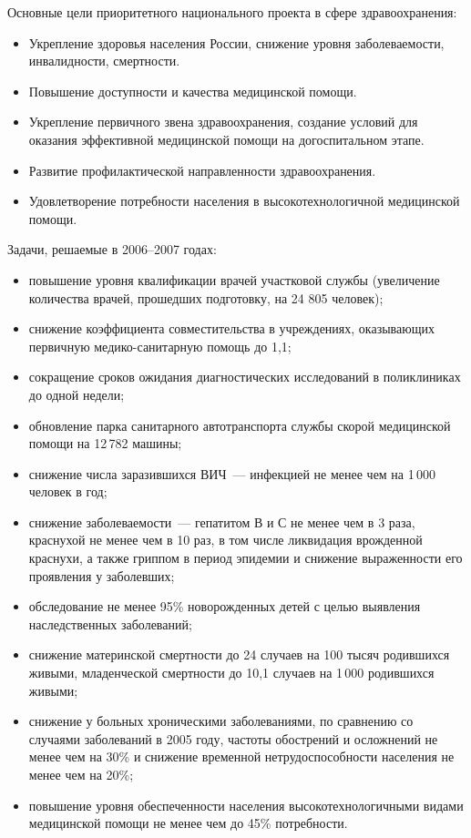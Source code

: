 \documentclass[article, 12pt, russian, oneside]{ncc}
\begin{document}
Основные цели приоритетного национального проекта в сфере здравоохранения:

\begin{itemize}
\item Укрепление здоровья населения России, снижение уровня заболеваемости, инвалидности, смертности.
\item Повышение доступности и качества медицинской помощи.
\item Укрепление первичного звена здравоохранения, создание условий для оказания эффективной медицинской помощи на догоспитальном этапе.
\item Развитие профилактической направленности здравоохранения.
\item Удовлетворение потребности населения в высокотехнологичной медицинской помощи.
\end{itemize}

Задачи, решаемые в 2006--2007 годах:

\begin{itemize}
\item повышение уровня квалификации врачей участковой службы (увеличение количества врачей, прошедших подготовку, на 24 805 человек);
\item снижение коэффициента совместительства в учреждениях, оказывающих первичную медико-санитарную помощь до 1,1;
\item сокращение сроков ожидания диагностических исследований в поликлиниках до одной недели;
\item обновление парка санитарного автотранспорта службы скорой медицинской помощи на 12\,782 машины;
\item снижение числа заразившихся ВИЧ~--- инфекцией не менее чем на 1\,000 человек в год;
\item снижение заболеваемости~--- гепатитом В и С не менее чем в 3 раза, краснухой не менее чем в 10 раз, в том числе ликвидация врожденной краснухи, а также гриппом в период эпидемии и снижение выраженности его проявления у заболевших;
\item обследование не менее 95\% новорожденных детей с целью выявления наследственных заболеваний;
\item снижение материнской смертности до 24 случаев на 100 тысяч родившихся живыми, младенческой смертности до 10,1 случаев на 1\,000 родившихся живыми;
\item снижение у больных хроническими заболеваниями, по сравнению со случаями заболеваний в 2005 году, частоты обострений и осложнений не менее чем на 30\% и снижение временной нетрудоспособности населения не менее чем на 20\%;
\item повышение уровня обеспеченности населения высокотехнологичными видами медицинской помощи не менее чем до 45\% потребности.
\end{itemize}
\end{document}
